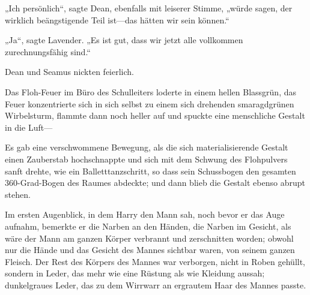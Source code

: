 „Ich persönlich“, sagte Dean, ebenfalls mit leiserer Stimme, „würde sagen, der wirklich beängstigende Teil ist—das hätten wir sein können.“

„Ja“, sagte Lavender. „Es ist gut, dass wir jetzt alle vollkommen zurechnungsfähig sind.“

Dean und Seamus nickten feierlich.


Das Floh-Feuer im Büro des Schulleiters loderte in einem hellen Blassgrün, das Feuer konzentrierte sich in sich selbst zu einem sich drehenden smaragdgrünen Wirbelsturm, flammte dann noch heller auf und spuckte eine menschliche Gestalt in die Luft—

Es gab eine verschwommene Bewegung, als die sich materialisierende Gestalt einen Zauberstab hochschnappte und sich mit dem Schwung des Flohpulvers sanft drehte, wie ein Balletttanzschritt, so dass sein Schussbogen den gesamten 360-Grad-Bogen des Raumes abdeckte; und dann blieb die Gestalt ebenso abrupt stehen.

Im ersten Augenblick, in dem Harry den Mann sah, noch bevor er das Auge aufnahm, bemerkte er die Narben an den Händen, die Narben im Gesicht, als wäre der Mann am ganzen Körper verbrannt und zerschnitten worden; obwohl nur die Hände und das Gesicht des Mannes sichtbar waren, von seinem ganzen Fleisch. Der Rest des Körpers des Mannes war verborgen, nicht in Roben gehüllt, sondern in Leder, das mehr wie eine Rüstung als wie Kleidung aussah; dunkelgraues Leder, das zu dem Wirrwarr an ergrautem Haar des Mannes passte.


